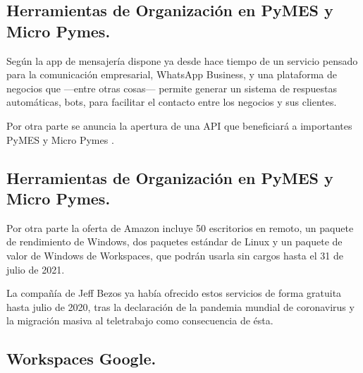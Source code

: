 \documentclass[
  letterpaper,
  DIV=11,
  numbers=noendperiod]{scrartcl}
\begin{document}
\hypertarget{herramientas-de-organizaciuxf3n-en-pymes-y-micro-pymes.-1}{%
\subsection{Herramientas de Organización en PyMES y Micro
Pymes.}\label{herramientas-de-organizaciuxf3n-en-pymes-y-micro-pymes.-1}}

Según \textcite{pregoWhatsAppAbreSu2022} la app de mensajería dispone ya
desde hace tiempo de un servicio pensado para la comunicación
empresarial, WhatsApp Business, y una plataforma de negocios que
---entre otras cosas--- permite generar un sistema de respuestas
automáticas, bots, para facilitar el contacto entre los negocios y sus
clientes.

Por otra parte se anuncia la apertura de una API que beneficiará a
importantes PyMES y Micro Pymes \textcite{pregoWhatsAppAbreSu2022}.

\hypertarget{herramientas-de-organizaciuxf3n-en-pymes-y-micro-pymes.-2}{%
\subsection{Herramientas de Organización en PyMES y Micro
Pymes.}\label{herramientas-de-organizaciuxf3n-en-pymes-y-micro-pymes.-2}}

Por otra parte \textcite{rodriguezAmazonOfreceGratuitamente2021} la
oferta de Amazon incluye 50 escritorios en remoto, un paquete de
rendimiento de Windows, dos paquetes estándar de Linux y un paquete de
valor de Windows de Workspaces, que podrán usarla sin cargos hasta el 31
de julio de 2021.

La compañía de Jeff Bezos ya había ofrecido estos servicios de forma
gratuita hasta julio de 2020, tras la declaración de la pandemia mundial
de coronavirus y la migración masiva al teletrabajo como consecuencia de
ésta.

\hypertarget{workspaces-google.}{%
\subsection{Workspaces Google.}\label{workspaces-google.}}
\end{document}
